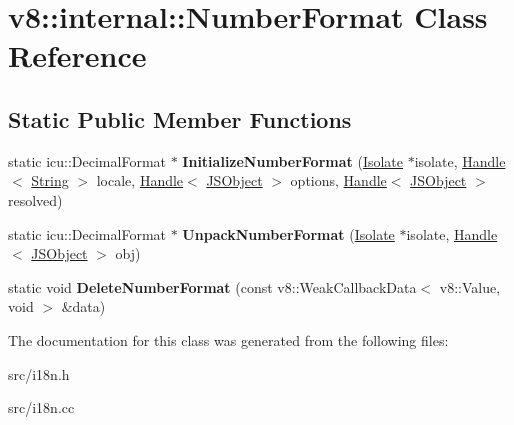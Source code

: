\hypertarget{classv8_1_1internal_1_1_number_format}{}\section{v8\+:\+:internal\+:\+:Number\+Format Class Reference}
\label{classv8_1_1internal_1_1_number_format}
\subsection*{Static Public Member Functions}
\begin{DoxyCompactItemize}
\item 
\hypertarget{classv8_1_1internal_1_1_number_format_a20e3fcf9dafa7af6360eef210a0368cd}{}static icu\+::\+Decimal\+Format $\ast$ {\bfseries Initialize\+Number\+Format} (\hyperlink{classv8_1_1internal_1_1_isolate}{Isolate} $\ast$isolate, \hyperlink{classv8_1_1internal_1_1_handle}{Handle}$<$ \hyperlink{classv8_1_1internal_1_1_string}{String} $>$ locale, \hyperlink{classv8_1_1internal_1_1_handle}{Handle}$<$ \hyperlink{classv8_1_1internal_1_1_j_s_object}{J\+S\+Object} $>$ options, \hyperlink{classv8_1_1internal_1_1_handle}{Handle}$<$ \hyperlink{classv8_1_1internal_1_1_j_s_object}{J\+S\+Object} $>$ resolved)\label{classv8_1_1internal_1_1_number_format_a20e3fcf9dafa7af6360eef210a0368cd}

\item 
\hypertarget{classv8_1_1internal_1_1_number_format_a2ee56e42efcf08f61503f156f10218f0}{}static icu\+::\+Decimal\+Format $\ast$ {\bfseries Unpack\+Number\+Format} (\hyperlink{classv8_1_1internal_1_1_isolate}{Isolate} $\ast$isolate, \hyperlink{classv8_1_1internal_1_1_handle}{Handle}$<$ \hyperlink{classv8_1_1internal_1_1_j_s_object}{J\+S\+Object} $>$ obj)\label{classv8_1_1internal_1_1_number_format_a2ee56e42efcf08f61503f156f10218f0}

\item 
\hypertarget{classv8_1_1internal_1_1_number_format_a8de7f5b69b234734ece94d2a04a780c7}{}static void {\bfseries Delete\+Number\+Format} (const v8\+::\+Weak\+Callback\+Data$<$ v8\+::\+Value, void $>$ \&data)\label{classv8_1_1internal_1_1_number_format_a8de7f5b69b234734ece94d2a04a780c7}

\end{DoxyCompactItemize}


The documentation for this class was generated from the following files\+:\begin{DoxyCompactItemize}
\item 
src/i18n.\+h\item 
src/i18n.\+cc\end{DoxyCompactItemize}
